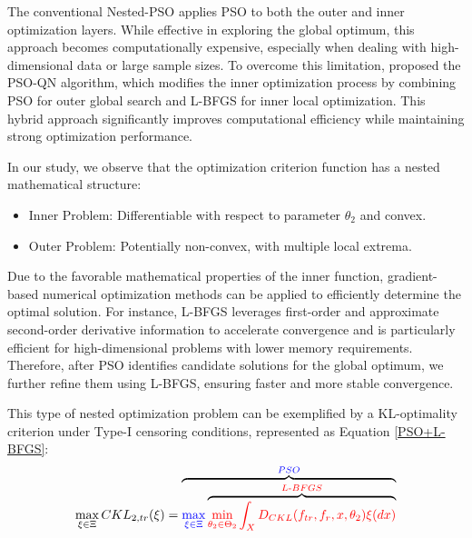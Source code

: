 \hspace*{8mm} The conventional Nested-PSO \citep{chen2015minimax} applies PSO to both the outer and inner optimization layers. While effective in exploring the global optimum, this approach becomes computationally expensive, especially when dealing with high-dimensional data or large sample sizes. To overcome this limitation, \cite{chen2020hybrid} proposed the PSO-QN algorithm, which modifies the inner optimization process by combining PSO for outer global search and L-BFGS for inner local optimization. This hybrid approach significantly improves computational efficiency while maintaining strong optimization performance.

\hspace*{8mm} In our study, we observe that the optimization criterion function has a nested mathematical structure:

\begin{itemize}
\item Inner Problem: Differentiable with respect to parameter $\theta_2$ and convex.  

\item Outer Problem: Potentially non-convex, with multiple local extrema.

\end{itemize}

\hspace*{8mm} Due to the favorable mathematical properties of the inner function, gradient-based numerical optimization methods can be applied to efficiently determine the optimal solution. For instance, L-BFGS leverages first-order and approximate second-order derivative information to accelerate convergence and is particularly efficient for high-dimensional problems with lower memory requirements. Therefore, after PSO identifies candidate solutions for the global optimum, we further refine them using L-BFGS, ensuring faster and more stable convergence.

\hspace*{8mm} This type of nested optimization problem can be exemplified by a KL-optimality criterion under Type-I censoring conditions, represented as Equation \eqref{PSO+L-BFGS}:
\begin{equation} \label{PSO+L-BFGS}
\max_{\xi\in \Xi} CKL_{2,tr}(\xi)=\overbrace{\textcolor{blue}{\max_{\xi\in \Xi}} \overbrace{\textcolor{red}{\min_{\substack{\theta_2\in \Theta_2}}\int_{X}D_{CKL}(f_{tr},f_r,x,\theta_2) \xi(dx)}}^{\textcolor{red}{L\text{-}BFGS}}}^{\textcolor{blue}{PSO}}
\end{equation}

